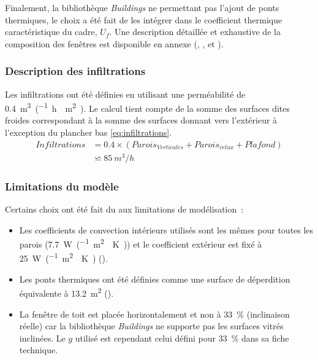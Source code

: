 Finalement, la bibliothèque \textit{Buildings} ne permettant pas l’ajout de ponts
thermiques, le choix a été fait de les intégrer dans le coefficient thermique
caractéristique du cadre, $U_{f}$. Une description détaillée et exhaustive de la
composition des fenêtres est disponible en annexe (,
, et ).


\subsubsection{Description des infiltrations} %
\label{ssub:description_des_infiltrations}
Les infiltrations ont été définies en utilisant une perméabilité de
\SI{0.4}{m^{3}\per(\hour\period\meter\squared)}. Le calcul tient compte de la
somme des surfaces dites froides correspondant à la somme des surfaces donnant
vers l’extérieur à l’exception du plancher bas \eqref{eq:infiltrations}.
\begin{equation}
    \begin{aligned}
    Infiltrations &= \num{0.4} \times (Parois_{Verticales} + Parois_{velux} + Plafond)\\
    &              \backsimeq \SI{85}{m^{3}/h}
    \label{eq:infiltrations}
    \end{aligned}
\end{equation}



\subsubsection{Limitations du modèle} %
\label{ssub:limitations_du_modele}
Certains choix ont été fait du aux limitations de modélisation~:
\begin{itemize}
    \item Les coefficients de convection intérieurs utilisés sont les mêmes pour toutes
          les parois (\SI{7.7}{\watt\per(\meter\squared\period\kelvin)}) et le coefficient extérieur
          est fixé à \SI{25}{\watt\per(\meter\squared\period\kelvin)} (\textcite{NFENISO6946}).
    \item Les ponts thermiques ont été définies comme une surface de déperdition
          équivalente à \SI{13.2}{\meter\squared} ().
    \item La fenêtre de toit est placée horizontalement et non à \SI{33}{\percent}
          (inclinaison réelle) car la bibliothèque \textit{Buildings} ne supporte pas les
          surfaces vitrés inclinées. Le $g$ utilisé est cependant celui défini
          pour \SI{33}{\percent} dans sa fiche technique.
\end{itemize}


